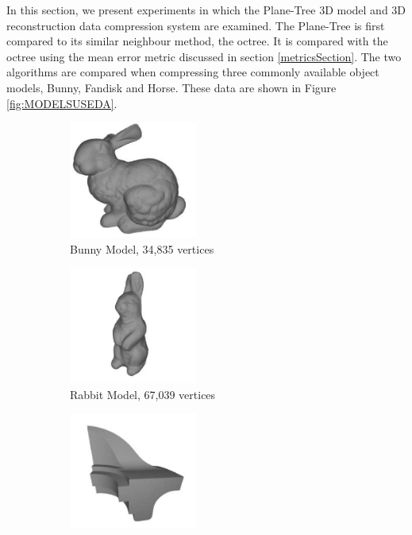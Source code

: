 
In this section, we present experiments in which the Plane-Tree 3D model and 3D reconstruction data compression system are examined. The Plane-Tree is first compared to its similar neighbour method, the octree. It is compared with the octree using the mean error metric discussed in section \ref{metricsSection}. The two algorithms are compared when compressing three commonly available object models, Bunny, Fandisk and Horse. These data are shown in Figure \ref{fig:MODELSUSEDA}. \\


\begin{figure}[t] 
        \begin{center}
 		\begin{subfigure}[b]{4.4cm}
 			   \centering
 			   \includegraphics[width=4.2cm]{images/experiments/test_data/models_used/bunny_34835}
 			   \captionsetup{justification=centering}
                \caption{Bunny Model, 34,835 vertices}
                \label{fig:MODELSUSEDA_BUNNY}
        \end{subfigure}%
        \begin{subfigure}[b]{4.4cm}
                \includegraphics[width=4.2cm]{images/experiments/test_data/models_used/rabbit_67039}
                \captionsetup{justification=centering}
                \caption{Rabbit Model, 67,039 vertices}
                \label{fig:MODELSUSEDA_RABBIT}
        \end{subfigure}
        \begin{subfigure}[b]{4.4cm}
                \includegraphics[width=4.2cm]{images/experiments/test_data/models_used/fandisk_6475}

\end{subfigure}
\end{center}
\end{figure}
